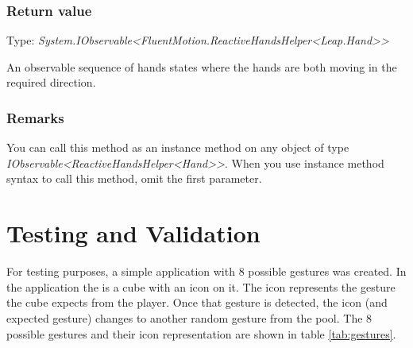 \documentclass[12pt,a4paper,twoside]{report}
\begin{document}
\subsection{Return value}
Type: \textit{System.IObservable<FluentMotion.ReactiveHandsHelper<Leap.Hand>{}>}

An observable sequence of hands states where the hands are both moving in the required direction.

\subsection{Remarks}
You can call this method as an instance method on any object of type \textit{IObservable<ReactiveHandsHelper<Hand>{}>}. When you use instance method syntax to call this method, omit the first parameter.

\chapter{Testing and Validation}

For testing purposes, a simple application with 8 possible gestures was created. In the application the is a cube with an icon on it. The icon represents the gesture the cube expects from the player. Once that gesture is detected, the icon (and expected gesture) changes to another random gesture from the pool. The 8 possible gestures and their icon representation are shown in table \ref{tab:gestures}.
\end{document}
